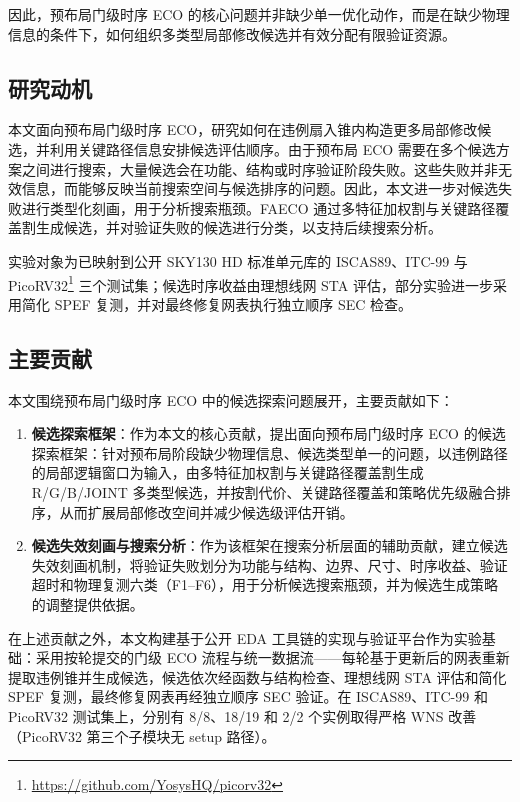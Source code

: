 \documentclass[twocolumn,10pt,fontset=windows]{ctexart}
\begin{document}
因此，预布局门级时序 ECO 的核心问题并非缺少单一优化动作，而是在缺少物理信息的条件下，如何组织多类型局部修改候选并有效分配有限验证资源。

\subsection{研究动机}
本文面向预布局门级时序 ECO，研究如何在违例扇入锥内构造更多局部修改候选，并利用关键路径信息安排候选评估顺序。由于预布局 ECO 需要在多个候选方案之间进行搜索，大量候选会在功能、结构或时序验证阶段失败。这些失败并非无效信息，而能够反映当前搜索空间与候选排序的问题。因此，本文进一步对候选失败进行类型化刻画，用于分析搜索瓶颈。FAECO 通过多特征加权割与关键路径覆盖割生成候选，并对验证失败的候选进行分类，以支持后续搜索分析。

实验对象为已映射到公开 SKY130 HD 标准单元库的 ISCAS89\cite{iscas89}、ITC-99\cite{itc99} 与 PicoRV32\footnote{\url{https://github.com/YosysHQ/picorv32}} 三个测试集；候选时序收益由理想线网 STA 评估，部分实验进一步采用简化 SPEF 复测，并对最终修复网表执行独立顺序 SEC 检查。

\subsection{主要贡献}
本文围绕预布局门级时序 ECO 中的候选探索问题展开，主要贡献如下：

\begin{enumerate}
  \item \textbf{候选探索框架}：作为本文的核心贡献，提出面向预布局门级时序 ECO 的候选探索框架：针对预布局阶段缺少物理信息、候选类型单一的问题，以违例路径的局部逻辑窗口为输入，由多特征加权割与关键路径覆盖割生成 R/G/B/JOINT 多类型候选，并按割代价、关键路径覆盖和策略优先级融合排序，从而扩展局部修改空间并减少候选级评估开销。
  \item \textbf{候选失效刻画与搜索分析}：作为该框架在搜索分析层面的辅助贡献，建立候选失效刻画机制，将验证失败划分为功能与结构、边界、尺寸、时序收益、验证超时和物理复测六类（F1--F6），用于分析候选搜索瓶颈，并为候选生成策略的调整提供依据。
\end{enumerate}

在上述贡献之外，本文构建基于公开 EDA 工具链的实现与验证平台作为实验基础：采用按轮提交的门级 ECO 流程与统一数据流——每轮基于更新后的网表重新提取违例锥并生成候选，候选依次经函数与结构检查、理想线网 STA 评估和简化 SPEF 复测，最终修复网表再经独立顺序 SEC 验证。在 ISCAS89、ITC-99 和 PicoRV32 测试集上，分别有 8/8、18/19 和 2/2 个实例取得严格 WNS 改善（PicoRV32 第三个子模块无 setup 路径）。
\end{document}
